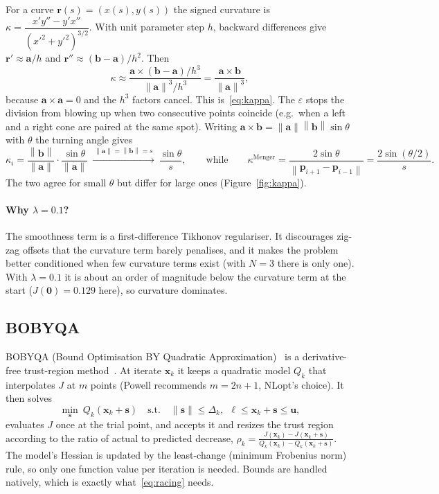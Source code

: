 \documentclass[10pt,a4paper]{scrartcl}
\newcommand{\norm}[1]{\left\lVert #1 \right\rVert}
\begin{document}
  For a curve $\bm r(s)=(x(s),y(s))$ the signed curvature is
  $\kappa=\dfrac{x'y''-y'x''}{(x'^2+y'^2)^{3/2}}$. With unit parameter step $h$,
  backward differences give $\bm r'\approx\bm a/h$ and
  $\bm r''\approx(\bm b-\bm a)/h^2$. Then
  \begin{equation}
    \kappa\approx\frac{\bm a\times(\bm b-\bm a)/h^3}{\norm{\bm a}^3/h^3}=\frac{\bm a\times\bm b}{\norm{\bm a}^3},
  \end{equation}
  because $\bm a\times\bm a=0$ and the $h^3$ factors cancel. This is~\eqref{eq:kappa}.
  The $\varepsilon$ stops the division from blowing up when two consecutive points
  coincide (e.g.\ when a left and a right cone are paired at the same spot). Writing
  $\bm a\times\bm b=\norm{\bm a}\norm{\bm b}\sin\theta$ with $\theta$ the turning
  angle gives
  \begin{equation}
    \kappa_i=\frac{\norm{\bm b}}{\norm{\bm a}}\cdot\frac{\sin\theta}{\norm{\bm a}}
    \ \xrightarrow{\ \norm{\bm a}=\norm{\bm b}=s\ }\ \frac{\sin\theta}{s},
    \qquad\text{while}\qquad
    \kappa^{\text{Menger}}=\frac{2\sin\theta}{\norm{\bm p_{i+1}-\bm p_{i-1}}}=\frac{2\sin(\theta/2)}{s}.
  \end{equation}
  The two agree for small $\theta$ but differ for large ones (Figure~\ref{fig:kappa}).

  \paragraph{Why $\lambda=0.1$?} The smoothness term is a first-difference Tikhonov
  regulariser. It discourages zig-zag offsets that the curvature term barely
  penalises, and it makes the problem better conditioned when few curvature terms
  exist (with $N=3$ there is only one). With $\lambda=0.1$ it is about an order of
  magnitude below the curvature term at the start ($J(\bm 0)=0.129$ here), so
  curvature dominates.

  \subsection{BOBYQA}

  BOBYQA (Bound Optimisation BY Quadratic Approximation)~\citep{powell2009bobyqa}
  is a derivative-free trust-region method~\citep{conn2009introduction}. At iterate
  $\bm x_k$ it keeps a quadratic model $Q_k$ that interpolates $J$ at $m$ points
  (Powell recommends $m=2n+1$, NLopt's choice). It then solves
  \begin{equation}
    \min_{\bm s}\ Q_k(\bm x_k+\bm s)\quad\text{s.t.}\quad\norm{\bm s}\le\Delta_k,\ \ \bm\ell\le\bm x_k+\bm s\le\bm u,
  \end{equation}
  evaluates $J$ once at the trial point, and accepts it and resizes the trust region
  according to the ratio of actual to predicted decrease,
  $\rho_k=\frac{J(\bm x_k)-J(\bm x_k+\bm s)}{Q_k(\bm x_k)-Q_k(\bm x_k+\bm s)}$. The
  model's Hessian is updated by the least-change (minimum Frobenius norm) rule, so
  only one function value per iteration is needed. Bounds are handled natively, which
  is exactly what~\eqref{eq:racing} needs.
\end{document}
